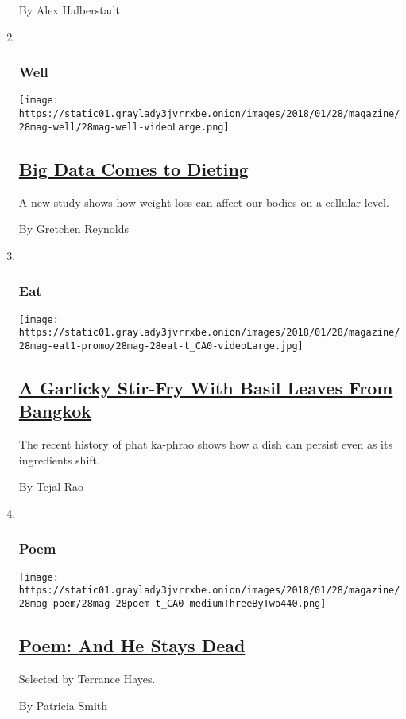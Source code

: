 \begin{enumerate}
  By Alex Halberstadt
\item ~
  \hypertarget{well}{%
  \subsubsection{Well}\label{well}}

  \texttt{[image: https://static01.graylady3jvrrxbe.onion/images/2018/01/28/magazine/28mag-well/28mag-well-videoLarge.png]}

  \hypertarget{big-data-comes-to-dieting}{%
  \subsection{\texorpdfstring{\href{/2018/01/25/well/eat/data-dieting-weight-gain-loss-fat-genes.html}{Big
  Data Comes to
  Dieting}}{Big Data Comes to Dieting}}\label{big-data-comes-to-dieting}}

  A new study shows how weight loss can affect our bodies on a cellular
  level.

  By Gretchen Reynolds
\item ~
  \hypertarget{eat}{%
  \subsubsection{Eat}\label{eat}}

  \texttt{[image: https://static01.graylady3jvrrxbe.onion/images/2018/01/28/magazine/28mag-eat1-promo/28mag-28eat-t\_CA0-videoLarge.jpg]}

  \hypertarget{a-garlicky-stir-fry-with-basil-leaves-from-bangkok}{%
  \subsection{\texorpdfstring{\href{/2018/01/25/magazine/a-garlicky-stir-fry-with-basil-leaves-from-bangkok.html}{A
  Garlicky Stir-Fry With Basil Leaves From
  Bangkok}}{A Garlicky Stir-Fry With Basil Leaves From Bangkok}}\label{a-garlicky-stir-fry-with-basil-leaves-from-bangkok}}

  The recent history of phat ka-phrao shows how a dish can persist even
  as its ingredients shift.

  By Tejal Rao
\item ~
  \hypertarget{poem}{%
  \subsubsection{Poem}\label{poem}}

  \texttt{[image: https://static01.graylady3jvrrxbe.onion/images/2018/01/28/magazine/28mag-poem/28mag-28poem-t\_CA0-mediumThreeByTwo440.png]}

  \hypertarget{poem-and-he-stays-dead}{%
  \subsection{\texorpdfstring{\href{/2018/01/26/magazine/poem-and-he-stays-dead.html}{Poem:
  And He Stays
  Dead}}{Poem: And He Stays Dead}}\label{poem-and-he-stays-dead}}

  Selected by Terrance Hayes.

  By Patricia Smith
\end{enumerate}


